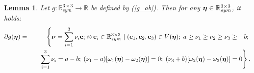 \documentclass[a4paper,12pt]{article}
\newtheorem{lem}{Lemma}[section]
\theoremstyle{remark}
\newcommand{\mbf}[1]{\mbox{\boldmath$#1$}}
\numberwithin{equation}{section}
\begin{document}
\begin{lem}
Let $g:\mathbb R^{3\times 3}_{sym}\rightarrow \mathbb R$ be defined by (\ref{g_ab}). Then for any $\mbf\eta\in\mathbb R^{3\times 3}_{sym}$, it holds:
\begin{eqnarray}
\partial g(\mbf\eta)&=&\left\{ \mbf\nu=\sum_{i=1}^3\nu_i\mathbf e_i\otimes\mathbf e_i\in\mathbb R^{3\times 3}_{sym}\ |\; (\mathbf e_1, \mathbf e_2, \mathbf e_3)\in V(\mbf\eta); \; a\geq\nu_1\geq\nu_2\geq\nu_3\geq -b;\right.\nonumber\\
&&\quad \left.\sum_{i=1}^3\nu_i=a-b;\; (\nu_1-a)[\omega_1(\mbf\eta)-\omega_2(\mbf\eta)]=0;\; (\nu_3+b)[\omega_2(\mbf\eta)-\omega_3(\mbf\eta)]=0 \right\}.
\label{sub_g_ab}
\end{eqnarray}
\label{lem_subdif}
\end{lem}
\end{document}
